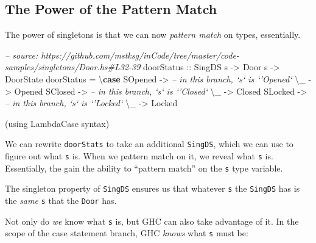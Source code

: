 \documentclass[]{article}
\newenvironment{Shaded}{}{}
\newcommand{\KeywordTok}[1]{\textcolor[rgb]{0.00,0.44,0.13}{\textbf{#1}}}
\newcommand{\DataTypeTok}[1]{\textcolor[rgb]{0.56,0.13,0.00}{#1}}
\newcommand{\CommentTok}[1]{\textcolor[rgb]{0.38,0.63,0.69}{\textit{#1}}}
\newcommand{\OtherTok}[1]{\textcolor[rgb]{0.00,0.44,0.13}{#1}}
\newcommand{\FunctionTok}[1]{\textcolor[rgb]{0.02,0.16,0.49}{#1}}
\newcommand{\NormalTok}[1]{#1}
\begin{document}
\subsection{The Power of the Pattern
Match}\label{the-power-of-the-pattern-match}

The power of singletons is that we can now \emph{pattern match} on types,
essentially.

\begin{Shaded}
\begin{Highlighting}[]
\CommentTok{-- source: https://github.com/mstksg/inCode/tree/master/code-samples/singletons/Door.hs#L32-39}
\OtherTok{doorStatus ::} \DataTypeTok{SingDS}\NormalTok{ s }\OtherTok{->} \DataTypeTok{Door}\NormalTok{ s }\OtherTok{->} \DataTypeTok{DoorState}
\NormalTok{doorStatus }\FunctionTok{=}\NormalTok{ \textbackslash{}}\KeywordTok{case}
    \DataTypeTok{SOpened} \OtherTok{->} \CommentTok{-- in this branch, `s` is `'Opened`}
\NormalTok{        \textbackslash{}_ }\OtherTok{->} \DataTypeTok{Opened}
    \DataTypeTok{SClosed} \OtherTok{->} \CommentTok{-- in this branch, `s` is `'Closed`}
\NormalTok{        \textbackslash{}_ }\OtherTok{->} \DataTypeTok{Closed}
    \DataTypeTok{SLocked} \OtherTok{->} \CommentTok{-- in this branch, `s` is `'Locked`}
\NormalTok{        \textbackslash{}_ }\OtherTok{->} \DataTypeTok{Locked}
\end{Highlighting}
\end{Shaded}

(using LambdaCase syntax)

We can rewrite \texttt{doorStats} to take an additional \texttt{SingDS}, which
we can use to figure out what \texttt{s} is. When we pattern match on it, we
reveal what \texttt{s} is. Essentially, the gain the ability to ``pattern
match'' on the \texttt{s} type variable.

The singleton property of \texttt{SingDS} ensures us that whatever \texttt{s}
the \texttt{SingDS} has is the \emph{same} \texttt{s} that the \texttt{Door}
has.

Not only do \emph{we} know what \texttt{s} is, but GHC can also take advantage
of it. In the scope of the case statement branch, GHC \emph{knows} what
\texttt{s} must be:
\end{document}
